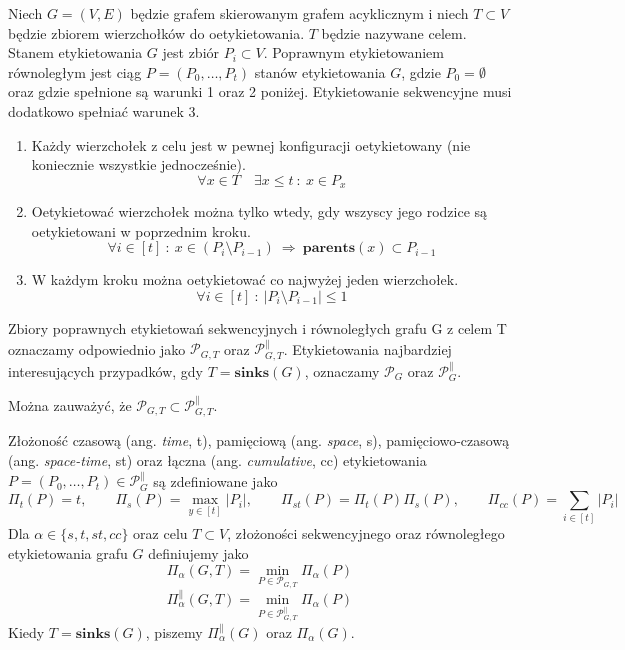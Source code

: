 \begin{definition}  Niech $G = (V, E)$ będzie grafem skierowanym grafem acyklicznym i niech $T \subset V$ będzie zbiorem wierzchołków do oetykietowania. $T$ będzie nazywane celem.
	Stanem etykietowania $G$ jest zbiór $P_{i} \subset V$.
	Poprawnym etykietowaniem równoległym jest ciąg $P = (P_{0}, \dots , P_{t})$ stanów etykietowania $G$,
	gdzie $P_{0} = \emptyset $ oraz gdzie spełnione są warunki 1 oraz 2 poniżej.
	Etykietowanie sekwencyjne musi dodatkowo spełniać warunek 3.
	\begin{enumerate}
		\item Każdy wierzchołek z celu jest w pewnej konfiguracji oetykietowany (nie koniecznie wszystkie jednocześnie).
		$$ \forall x \in T \quad \exists x \leq t \ : \ x \in P_{x} $$
		
		\item Oetykietować wierzchołek można tylko wtedy, gdy wszyscy jego rodzice
		są oetykietowani w poprzednim kroku.
		$$ \forall i \in [t] \ : \ x \in (P_{i} \setminus P_{i-1}) \ \Rightarrow \ \mathbf{parents}(x) \subset P_{i-1} $$
		
		\item W każdym kroku można oetykietować co najwyżej jeden wierzchołek.
		$$ \forall i \in [t] \ : \ | P_{i} \setminus P_{i-1} | \leq 1 $$
	\end{enumerate}
	Zbiory poprawnych etykietowań sekwencyjnych i równoległych grafu G z celem T oznaczamy odpowiednio jako 
	$ \mathcal{P}_{G,T} $ oraz $ \mathcal{P}_{G,T}^{ \parallel } $.
	Etykietowania najbardziej interesujących przypadków, gdy $T = \mathbf{sinks}(G)$, oznaczamy $ \mathcal{P}_{G} $ oraz $ \mathcal{P}_{G}^{ \parallel } $.
\end{definition}


 Można zauważyć, że $ \mathcal{P}_{G,T} \subset  \mathcal{P}_{G,T}^{ \parallel } $.

\begin{definition}
	Złożoność czasową (ang. \textit{time}, t), pamięciową (ang. \textit{space}, s), pamięciowo-czasową (ang. \textit{space-time}, st) oraz łączna (ang. \textit{cumulative}, cc) etykietowania $ P = (P_{0}, \dots , P_{t} ) \in \mathcal{P}_{G}^{ \parallel } $ są zdefiniowane jako
	$$ \Pi_{t}(P) = t, \qquad \Pi_{s}(P) = \max_{y \in [t]} | P_{i} |, \qquad \Pi_{st}(P) = \Pi_{t}(P) \Pi_{s}(P), \qquad \Pi_{cc}(P) = \sum_{i \in [t]}| P_{i}|$$
	Dla $ \alpha \in \{s, t, st, cc \}$ oraz celu $T \subset V $, złożoności sekwencyjnego oraz równoległego
	etykietowania grafu $G$ definiujemy jako
	$$ \Pi_{ \alpha }(G, T) = \min_{P \in \mathcal{P}_{G,T}} \Pi_{ \alpha } (P) $$
	$$ \Pi_{ \alpha }^{ \parallel }(G, T) = \min_{P \in \mathcal{P}_{G,T}^{ \parallel }} \Pi_{ \alpha } (P) $$
	Kiedy $T = \mathbf{sinks}(G)$, piszemy $ \Pi_{ \alpha }^{ \parallel }(G) $ oraz $ \Pi_{ \alpha }(G) $.
	
\end{definition}

